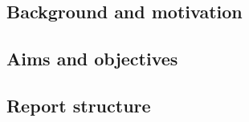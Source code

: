   
  
  
    \subsection{Background and motivation}
    
    \subsection{Aims and objectives}
  
    
    \subsection{Report structure} %
  
